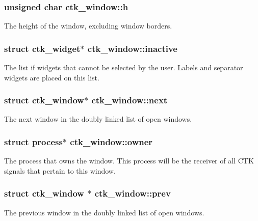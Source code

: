 \subsubsection[{h}]{\setlength{\rightskip}{0pt plus 5cm}unsigned char ctk\+\_\+window\+::h}\label{structctk__window_ae2d4a4d04e07beaf18e7581f42d317dc}
The height of the window, excluding window borders. \hypertarget{structctk__window_ab37295c4d4a76d30daef3c05e4c14bc4}{}
\subsubsection[{inactive}]{\setlength{\rightskip}{0pt plus 5cm}struct {\bf ctk\+\_\+widget}$\ast$ ctk\+\_\+window\+::inactive}\label{structctk__window_ab37295c4d4a76d30daef3c05e4c14bc4}
The list if widgets that cannot be selected by the user. Labels and separator widgets are placed on this list. \hypertarget{structctk__window_a92e81d0f1ffd6a52ce0fa29caedaca3c}{}
\subsubsection[{next}]{\setlength{\rightskip}{0pt plus 5cm}struct {\bf ctk\+\_\+window}$\ast$ ctk\+\_\+window\+::next}\label{structctk__window_a92e81d0f1ffd6a52ce0fa29caedaca3c}
The next window in the doubly linked list of open windows. \hypertarget{structctk__window_aa0a9f81cb95a7f999c2618ee2c19afe6}{}
\subsubsection[{owner}]{\setlength{\rightskip}{0pt plus 5cm}struct process$\ast$ ctk\+\_\+window\+::owner}\label{structctk__window_aa0a9f81cb95a7f999c2618ee2c19afe6}
The process that owns the window. This process will be the receiver of all C\+T\+K signals that pertain to this window. \hypertarget{structctk__window_a5c2fbd8367afa325aaf22c6bbf3c634f}{}
\subsubsection[{prev}]{\setlength{\rightskip}{0pt plus 5cm}struct {\bf ctk\+\_\+window} $\ast$ ctk\+\_\+window\+::prev}\label{structctk__window_a5c2fbd8367afa325aaf22c6bbf3c634f}
The previous window in the doubly linked list of open windows. \hypertarget{structctk__window_a88d87bdebfbac969714162a150325eb9}{}
